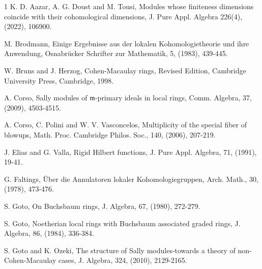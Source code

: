 \documentclass[11pt,reqno]{amsart}
\theoremstyle{definition}
\newcommand{\m}{\mathfrak m}
\numberwithin{equation}{section}
\begin{document}
\begin{thebibliography}{1}
 K. D. Aazar, A. G. Doust and M. Tousi, Modules whose finiteness dimensions coincide with their cohomological dimensions, J. Pure Appl. Algebra 226(4), (2022), 106900. 


 M. Brodmann,  Einige Ergebnisse aus der lokalen Kohomologietheorie und ihre Anwendung, Osnabr\"ucker Schrifter zur Mathematik, 5, (1983), 439-445.

 W. Bruns and J. Herzog, Cohen-Macaulay rings, Revised Edition, Cambridge University Press, Cambridge, 1998.


 A. Corso, Sally modules of $\m$-primary ideals in local rings, Comm. Algebra, 37, (2009), 4503-4515.




 A. Corso, C. Polini and W. V. Vasconcelos, Multiplicity of the special fiber of blowups, Math. Proc. Cambridge Philos. Soc., 140, (2006), 207-219.

 J. Elias and G. Valla, Rigid Hilbert functions, J. Pure Appl. Algebra, 71, (1991), 19-41.

 G. Faltings, \"Uber die Annulatoren lokaler Kohomologiegruppen, Arch. Math., 30, (1978), 473-476.

 S. Goto, On Buchsbaum rings, J. Algebra, 67, (1980), 272-279.




 S. Goto, Noetherian local rings with Buchsbaum associated graded rings, J. Algebra, 86, (1984), 336-384.


 S. Goto and K. Ozeki, The structure of Sally modules-towards a theory of non-Cohen-Macaulay cases, J. Algebra, 324, (2010), 2129-2165.



\end{thebibliography}
\end{document}
